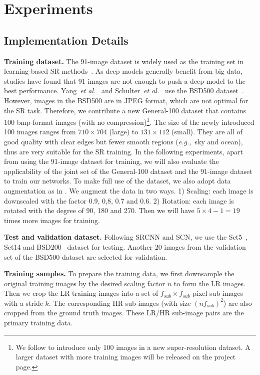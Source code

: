 \documentclass[runningheads]{llncs}
\newcommand{\etal}{\emph{et al.}}
\newcommand{\eg}{\emph{e.g.,}}
\begin{document}
\section{Experiments}

\subsection{Implementation Details}
\noindent
\textbf{Training dataset.} The 91-image dataset is widely used as the training set in learning-based SR methods~\cite{Yang2010a,Timofte2014,Dong2014}.
As deep models generally benefit from big data, studies have found that 91 images are not enough to push a deep model to the best performance. Yang~\etal~\cite{Yang2014} and Schulter~\etal~\cite{Schulter2015} use the BSD500 dataset~\cite{martin2001database}. However, images in the BSD500 are in JPEG format, which are not optimal for the SR task.
Therefore, we contribute a new General-100 dataset that contains 100 bmp-format images (with no compression)\footnote{We follow \cite{Huang2015} to introduce only 100 images in a new super-resolution dataset. A larger dataset with more training images will be released on the project page.}. The size of the newly introduced 100 images ranges from $710\times 704$ (large) to $131\times 112$ (small). They are all of good quality with clear edges but fewer smooth regions (\eg~sky and ocean), thus are very suitable for the SR training. In the following experiments, apart from using the 91-image dataset for training, we will also evaluate the applicability of the joint set of the General-100 dataset and the 91-image dataset to train our networks.
To make full use of the dataset, we also adopt data augmentation as in \cite{Wang2015}. We augment the data in two ways. 1) Scaling: each image is downscaled with the factor 0.9, 0,8, 0.7 and 0.6. 2) Rotation: each image is rotated with the degree of 90, 180 and 270. Then we will have $5\times 4-1=19$ times more images for training.

\noindent
\textbf{Test and validation dataset.} Following SRCNN and SCN, we use the Set5~\cite{Bevilacqua2012}, Set14 \cite{Zeyde2012} and BSD200~\cite{martin2001database} dataset for testing. Another 20 images from the validation set of the BSD500 dataset are selected for validation.


\noindent
\textbf{Training samples.} To prepare the training data, we first downsample the original training images by the desired scaling factor $n$ to form the LR images. Then we crop the LR training images into a set of $f_{sub}\times f_{sub}$-pixel sub-images with a stride $k$. The corresponding HR sub-images (with size $(nf_{sub})^2$) are also cropped from the ground truth images. These LR/HR sub-image pairs are the primary training data.
\end{document}
